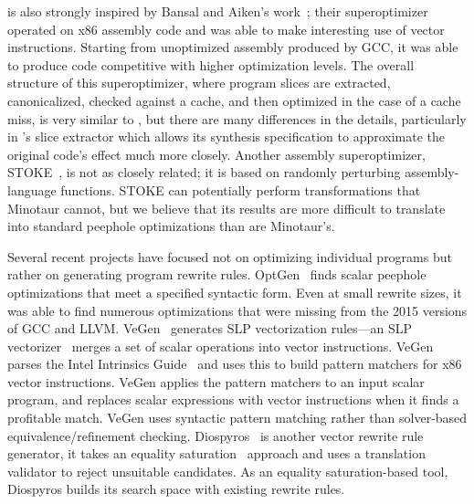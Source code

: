 \minotaur{} is also strongly inspired by Bansal and Aiken's
work~\cite{Bansal06}; their superoptimizer operated on x86 assembly
code and was able to make interesting use of vector instructions.
%
Starting from unoptimized assembly produced by GCC, it was able to
produce code competitive with higher optimization levels.
%
The overall structure of this superoptimizer, where program slices
are extracted, canonicalized, checked against a cache, and then
optimized in the case of a cache miss, is very similar to \minotaur{}, but
there are many differences in the details, particularly in \minotaur's
slice extractor which allows its synthesis specification to
approximate the original code's effect much more closely.
%
Another assembly superoptimizer, STOKE~\cite{stoke, stoke-fp,
  conditionally}, is not as closely related; it is based on randomly
perturbing assembly-language functions.
%
STOKE can potentially perform transformations that Minotaur cannot,
but we believe that its results are more difficult to translate into
standard peephole optimizations than are Minotaur's.


Several recent projects have focused not on optimizing individual
programs but rather on generating program rewrite rules.
%
OptGen~\cite{optgen} finds scalar peephole optimizations that meet
a specified syntactic form.
%
Even at small rewrite sizes, it was able to find numerous
optimizations that were missing from the 2015 versions of GCC and
LLVM\@.
%
VeGen~\cite{vegen} generates SLP vectorization rules---an SLP
vectorizer~\cite{slp} merges a set of scalar operations into vector
instructions.
%
VeGen parses the Intel Intrinsics Guide~\cite{intelguide} and uses this
to build pattern matchers for x86 vector instructions.
%
VeGen applies the pattern matchers to an input scalar program, and
replaces scalar expressions with vector instructions when it
finds a profitable match.
%
VeGen uses syntactic pattern matching rather than solver-based
equivalence/refinement checking.
%
Diospyros~\cite{diospyros} is another vector rewrite rule generator,
it takes an equality saturation~\cite{equalitysat} approach and uses a translation
validator to reject unsuitable candidates.
As an equality saturation-based tool, Diospyros builds its search space
with existing rewrite rules.


